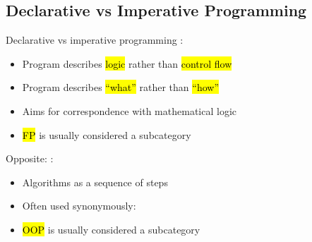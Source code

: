 \subsection[Declarative vs Imperative]{Declarative vs Imperative Programming}


\begin{frame}{Declarative vs imperative programming}
	:
	\begin{itemize}
		\item Program describes \hl{logic} rather than \hl{control flow}
		\item Program describes \hl{\enquote{what}} rather than \hl{\enquote{how}}
		\item Aims for correspondence with mathematical logic
		\item \hl{FP} is usually considered a subcategory
	\end{itemize}
	
	\medskip
	Opposite: :
	\begin{itemize}
		\item Algorithms as a sequence of steps
		\item Often used synonymously:  
		\item \hl{OOP} is usually considered a subcategory
	\end{itemize}
\end{frame}

